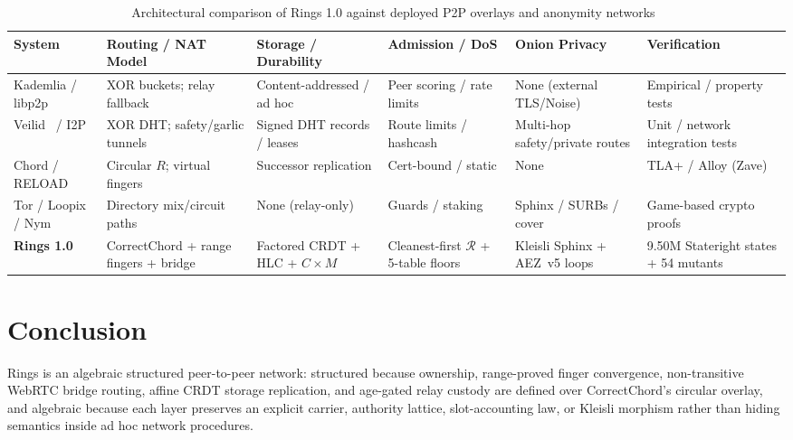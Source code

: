 \documentclass[journal]{IEEEtran}
\begin{document}
\begin{table}[t]
\centering
\caption{Architectural comparison of Rings 1.0 against deployed P2P overlays and anonymity networks~\cite{Kademlia,IPFS,Libp2p,Chord,ZaveChordCorrect,RFC6940,TorNetwork,NymNetwork,Veilid2023}}
\label{related-table}
\scriptsize
\setlength{\tabcolsep}{3.5pt}
\begin{tabular}{@{}l>{\raggedright\arraybackslash}p{2.9cm}>{\raggedright\arraybackslash}p{2.7cm}>{\raggedright\arraybackslash}p{2.7cm}>{\raggedright\arraybackslash}p{2.7cm}>{\raggedright\arraybackslash}p{2.9cm}@{}}
\toprule
\textbf{System} & \textbf{Routing / NAT Model} & \textbf{Storage / Durability} & \textbf{Admission / DoS} & \textbf{Onion Privacy} & \textbf{Verification} \\
\midrule
Kademlia / libp2p & XOR buckets; relay fallback & Content-addressed / ad hoc & Peer scoring / rate limits & None (external TLS/Noise) & Empirical / property tests \\
Veilid~\cite{Veilid2023} / I2P & XOR DHT; safety/garlic tunnels & Signed DHT records / leases & Route limits / hashcash & Multi-hop safety/private routes & Unit / network integration tests \\
Chord / RELOAD    & Circular $R$; virtual fingers & Successor replication     & Cert-bound / static         & None                       & TLA+ / Alloy (Zave) \\
Tor / Loopix / Nym& Directory mix/circuit paths  & None (relay-only)         & Guards / staking            & Sphinx / SURBs / cover     & Game-based crypto proofs \\
\textbf{Rings 1.0}& CorrectChord + range fingers + bridge & Factored CRDT + HLC + $C{\times}M$ & Cleanest-first $\mathcal{R}$ + 5-table floors & Kleisli Sphinx + AEZ~v5 loops & 9.50M Stateright states + 54 mutants \\
\bottomrule
\end{tabular}
\end{table}

\section{Conclusion}

Rings is an algebraic structured peer-to-peer network: structured because ownership, range-proved finger convergence, non-transitive WebRTC bridge routing, affine CRDT storage replication, and age-gated relay custody are defined over CorrectChord's circular overlay, and algebraic because each layer preserves an explicit carrier, authority lattice, slot-accounting law, or Kleisli morphism rather than hiding semantics inside ad hoc network procedures.
\end{document}

